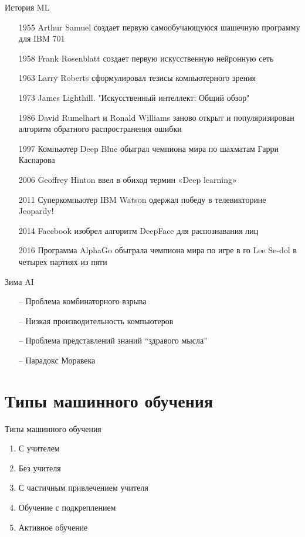 \documentclass[10pt]{beamer}
\begin{document}
\begin{frame}{История ML}
	\begin{itemize} [<+->]
	  \item[1955] Arthur Samuel создает первую самообучающуюся шашечную программу для IBM 701
	  \item[1958] Frank Rosenblatt создает первую искусственную нейронную сеть
	  \item[1963] Larry Roberts сформулировал тезисы компьютерного зрения
	  \item[1973] James Lighthill. "Искусственный интеллект: Общий обзор"
	  \item[1986] David Rumelhart и Ronald Williams заново открыт и популяризирован алгоритм обратного распространения ошибки
	  \item[1997] Компьютер Deep Blue обыграл чемпиона мира по шахматам Гарри Каспарова
	  \item[2006] Geoffrey Hinton ввел в обиход термин «Deep learning» 
	  \item[2011] Суперкомпьютер IBM Watson одержал победу в телевикторине Jeopardy!
	  \item[2014] Facebook изобрел алгоритм DeepFace для распознавания лиц
	  \item[2016] Программа AlphaGo обыграла чемпиона мира по игре в го Lee Se-dol в четырех партиях из пяти
	\end{itemize}
\end{frame}

{
\begin{frame}{Зима AI}
	\begin{itemize} [<+->]
	  \item[--] Проблема комбинаторного взрыва
	  \item[--] Низкая производительность компьютеров
	  \item[--] Проблема представлений знаний “здравого мысла”
	  \item[--] Парадокс Моравека
	\end{itemize}
\end{frame}
}

\section{Типы машинного обучения}

\begin{frame}{Типы машинного обучения}
	\begin{enumerate}
	  \item С учителем
	  \item Без учителя
	  \item С частичным привлечением учителя
	  \item Обучение с подкреплением
	  \item Активное обучение
	\end{enumerate}
\end{frame}
\end{document}
